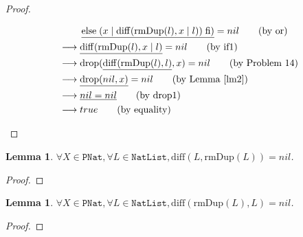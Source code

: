 \documentclass[12pt, a4paper]{article}
\newtheorem{lemma}[theorem]{Lemma}
\newcommand{\rel}[1]{\mathrel{#1}}
\newcommand{\rmx}[1]{\mathrm{#1}}
\newcommand{\larrow}{\longrightarrow}
\newcommand{\under}{\underline}
\begin{document}
\begin{proof}
\begin{description}
\begin{align*}
	&\quad \quad\ \under{\rel{\rmx{else}} (x \mid \rmx{diff}(\rmx{rmDup}(l), x \mid l)) \rel{\rmx{fi}})} = nil \tag{by or} \\
	&\larrow \under{\rmx{diff}(\rmx{rmDup}(l), x \mid l)} = nil \tag{by if1} \\
	&\larrow \rmx{drop}(\under{\rmx{diff}(\rmx{rmDup}(l), l)}, x) = nil \tag{by Problem 14} \\
	&\larrow \under{\rmx{drop}(nil, x)} = nil \tag{by Lemma~\ref{lm2}} \\
	&\larrow \under{nil = nil} \tag{by drop1} \\
	&\larrow true \tag{by equality}
\end{align*}
\end{description}
\end{proof}

\begin{lemma}
\label{lm1}
$\forall X \in \mathtt{PNat}, \forall L \in \mathtt{NatList}, \rmx{diff}(L, \rmx{rmDup}(L)) = nil$.
\end{lemma}
\begin{proof}
\end{proof}

\begin{lemma}
\label{lm2}
$\forall X \in \mathtt{PNat}, \forall L \in \mathtt{NatList}, \rmx{diff}(\rmx{rmDup}(L), L) = nil$.
\end{lemma}
\begin{proof}
\end{proof}
\end{document}
